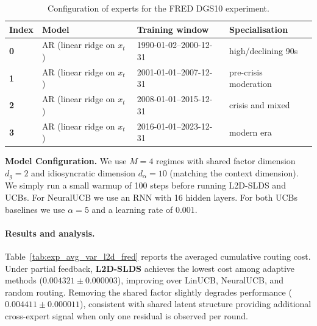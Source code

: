 \begin{table}[ht]
\centering
\small
\setlength{\tabcolsep}{4pt}
\caption{Configuration of experts for the FRED DGS10 experiment.}
\label{tab:experts_fred_appendix}
\begin{tabular}{@{}llll@{}}
\toprule
Index & Model & Training window & Specialisation \\
\midrule
\textbf{0} & AR (linear ridge on \(x_t\)) & 1990-01-02--2000-12-31 & high/declining 90s \\
\textbf{1} & AR (linear ridge on \(x_t\)) & 2001-01-01--2007-12-31 & pre-crisis moderation\\
\textbf{2} & AR (linear ridge on \(x_t\)) & 2008-01-01--2015-12-31 & crisis and mixed \\
\textbf{3} & AR (linear ridge on \(x_t\)) & 2016-01-01--2023-12-31 & modern era \\
\bottomrule
\end{tabular}
\end{table}

\textbf{Model Configuration.}
We use \(M=4\) regimes with shared factor dimension \(d_g=2\) and idiosyncratic dimension \(d_\alpha=10\) (matching the context
dimension). We simply run a small warmup of 100 steps before
running L2D-SLDS and UCBs. For NeuralUCB we use an RNN with 16 hidden layers. For both UCBs baselines we use
$\alpha=5$ and a learning rate of $0.001$.

\paragraph{Results and analysis.}
Table~\ref{tab:exp_avg_var_l2d_fred} reports the averaged cumulative routing cost. Under partial feedback, \textbf{L2D-SLDS}
achieves the lowest cost among adaptive methods (\(0.004321\pm0.000003\)), improving over LinUCB, NeuralUCB, and random routing.
Removing the shared factor slightly degrades performance (\(0.004411\pm0.000011\)), consistent with shared latent structure
providing additional cross-expert signal when only one residual is observed per round.

